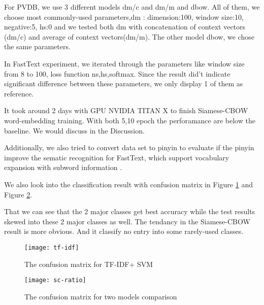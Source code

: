 For PVDB, we use 3 different models dm/c and dm/m and dbow. All of them, we choose most commonly-used parameters,dm : dimension:100, window size:10, negative:5, hs:0 and we tested both dm with concatenation of context vectors (dm/c) and average of context vectors(dm/m). 
The other model dbow, we chose the same parameters.

In FastText experiment, we iterated through the parameters like window size from 8 to 100, 
loss function ns,hs,softmax.  Since the result did't indicate significant difference between these parameters, 
we only display 1 of them as reference.

It took around 2 days with GPU NVIDIA TITAN X to finish Siamese-CBOW word-embedding training. With both 5,10 epoch the perforamance are below the baseline. 
We would discuss in the Discussion. 

Additionally, we also tried to convert data set to pinyin to evaluate 
if the pinyin improve the sematic recognition for FastText, 
which support vocabulary expansion with subword information \cite{bojanowski2016enriching}. 

We also look into the classification result with confusion matrix in Figure \ref{confusion1} and Figure \ref{confusion2}.

That we can see that the 2 major classes get best accuracy while the test results skewed into these 2 major classes as well.  
The tendancy in the Siamese-CBOW result is more obvious. And it classify no entry into some rarely-used classes.

\begin{figure}[h]
    \centering
	\texttt{[image: tf-idf]}
    \caption{The confusion matrix for TF-IDF+ SVM}
    \label{confusion1}
\end{figure}

\begin{figure}[h]
    \centering
	\texttt{[image: sc-ratio]}
    \caption{The confusion matrix for two models comparison}
    \label{confusion2}
\end{figure}